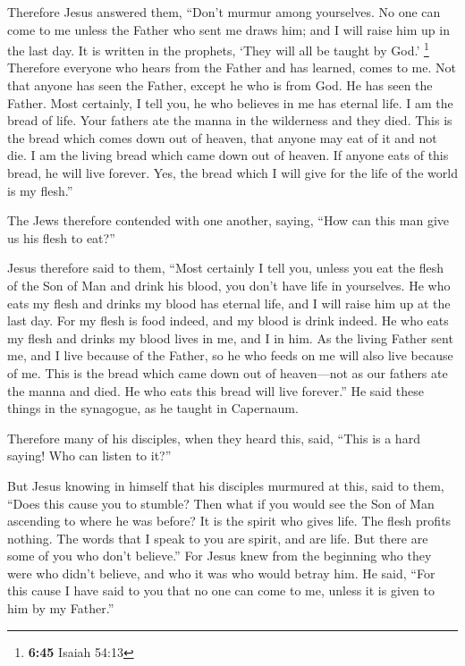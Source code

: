  Therefore Jesus answered them, ``Don't murmur among
yourselves.  No one can come to me unless the Father who
sent me draws him; and I will raise him up in the last day.
 It is written in the prophets, `They will all be taught
by God.' \footnote{\textbf{6:45} Isaiah 54:13} Therefore everyone who
hears from the Father and has learned, comes to me.  Not
that anyone has seen the Father, except he who is from God. He has seen
the Father.  Most certainly, I tell you, he who believes
in me has eternal life.  I am the bread of life.
 Your fathers ate the manna in the wilderness and they
died.  This is the bread which comes down out of heaven,
that anyone may eat of it and not die.  I am the living
bread which came down out of heaven. If anyone eats of this bread, he
will live forever. Yes, the bread which I will give for the life of the
world is my flesh.''

 The Jews therefore contended with one another, saying,
``How can this man give us his flesh to eat?''

 Jesus therefore said to them, ``Most certainly I tell
you, unless you eat the flesh of the Son of Man and drink his blood, you
don't have life in yourselves.  He who eats my flesh and
drinks my blood has eternal life, and I will raise him up at the last
day.  For my flesh is food indeed, and my blood is drink
indeed.  He who eats my flesh and drinks my blood lives
in me, and I in him.  As the living Father sent me, and I
live because of the Father, so he who feeds on me will also live because
of me.  This is the bread which came down out of
heaven---not as our fathers ate the manna and died. He who eats this
bread will live forever.''  He said these things in the
synagogue, as he taught in Capernaum.

 Therefore many of his disciples, when they heard this,
said, ``This is a hard saying! Who can listen to it?''

 But Jesus knowing in himself that his disciples murmured
at this, said to them, ``Does this cause you to stumble? 
Then what if you would see the Son of Man ascending to where he was
before?  It is the spirit who gives life. The flesh
profits nothing. The words that I speak to you are spirit, and are life.
 But there are some of you who don't believe.'' For Jesus
knew from the beginning who they were who didn't believe, and who it was
who would betray him.  He said, ``For this cause I have
said to you that no one can come to me, unless it is given to him by my
Father.''

